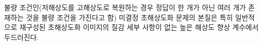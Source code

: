 \documentclass[10pt,twocolumn,letterpaper]{article}
\newcommand{\kor}[1]{#1}
\newcommand{\eng}[1]{}
\begin{document}
\eng{
The ill-posed nature of the underdetermined \ac{SR} problem is particularly pronounced for high upscaling factors, for which texture detail in the reconstructed \ac{SR} images is typically absent.
}\kor{
불량 조건인(\ac{저해상도}를 \ac{고해상도}로 복원하는 경우 정답이 한 개가 아닌 여러 개가 존재하는 것을 불량 조건을 가진다고 함) 미결정 \ac{초해상도화} 문제의 본질은 특히 일반적으로 재구성된 \ac{초해상도화} 이미지의 질감 세부 사항이 없는 높은 해상도 향상 계수에서 두드러진다.
}
%
%
\end{document}

